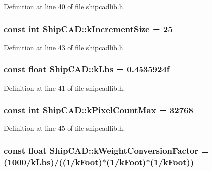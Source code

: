 Definition at line 40 of file shipcadlib.\-h.

\hypertarget{namespaceShipCAD_a1c0de7dc4306d7908bd8c6f7ff69ecdc}{
\subsubsection[{k\-Increment\-Size}]{\setlength{\rightskip}{0pt plus 5cm}const int Ship\-C\-A\-D\-::k\-Increment\-Size = 25}}\label{namespaceShipCAD_a1c0de7dc4306d7908bd8c6f7ff69ecdc}


Definition at line 43 of file shipcadlib.\-h.

\hypertarget{namespaceShipCAD_ad6937518d9742e268b279000d1e7a509}{
\subsubsection[{k\-Lbs}]{\setlength{\rightskip}{0pt plus 5cm}const float Ship\-C\-A\-D\-::k\-Lbs = 0.\-4535924f}}\label{namespaceShipCAD_ad6937518d9742e268b279000d1e7a509}


Definition at line 41 of file shipcadlib.\-h.

\hypertarget{namespaceShipCAD_ac8176e9d12f859826fb131b7febb8c8a}{
\subsubsection[{k\-Pixel\-Count\-Max}]{\setlength{\rightskip}{0pt plus 5cm}const int Ship\-C\-A\-D\-::k\-Pixel\-Count\-Max = 32768}}\label{namespaceShipCAD_ac8176e9d12f859826fb131b7febb8c8a}


Definition at line 45 of file shipcadlib.\-h.

\hypertarget{namespaceShipCAD_aa4319c8e7adfa68048f95c1614984036}{
\subsubsection[{k\-Weight\-Conversion\-Factor}]{\setlength{\rightskip}{0pt plus 5cm}const float Ship\-C\-A\-D\-::k\-Weight\-Conversion\-Factor = (1000/{\bf k\-Lbs})/((1/{\bf k\-Foot})$\ast$(1/{\bf k\-Foot})$\ast$(1/{\bf k\-Foot}))}}\label{namespaceShipCAD_aa4319c8e7adfa68048f95c1614984036}


